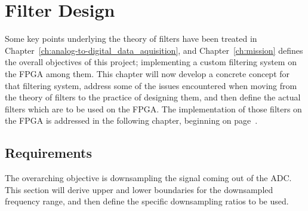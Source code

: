 \chapter{Filter Design} %
\label{ch:filter_design}

Some    key    points    underlying     the    theory    of    filters    have
been   treated   in  Chapter~\ref{ch:analog-to-digital_data_aquisition},   and
Chapter~\ref{ch:mission}  defines  the  overall objectives  of  this  project;
implementing a  custom filtering system  on the FPGA among  them. This chapter
will now develop a concrete concept for that filtering system, address some of
the issues encountered when moving from  the theory of filters to the practice
of designing them, and then define the  actual filters which are to be used on
the FPGA. The implementation of those filters  on the FPGA is addressed in the
following chapter, beginning on page~\pageref{ch:fpga}.


\section{Requirements} %
\label{sec:requirements}

The overarching  objective is downsampling the  signal coming out of  the ADC.
This  section will  derive  upper  and lower  boundaries  for the  downsampled
frequency range, and then define the specific downsampling ratios to be used.

